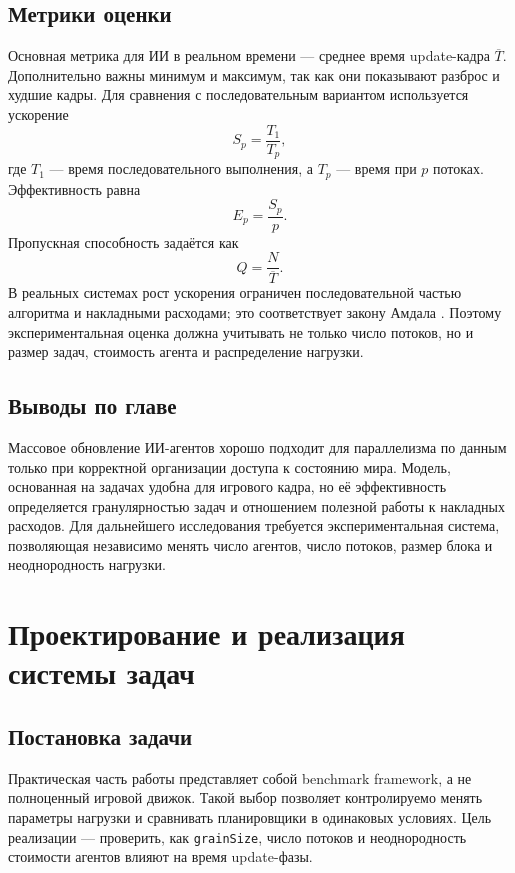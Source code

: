 \documentclass[14pt,a4paper,oneside]{extreport}
\begin{document}
\section{Метрики оценки}

Основная метрика для ИИ в реальном времени --- среднее время update-кадра \(\overline{T}\). Дополнительно важны минимум и максимум, так как они показывают разброс и худшие кадры. Для сравнения с последовательным вариантом используется ускорение
\begin{equation}
S_p = \frac{T_1}{T_p},
\end{equation}
где \(T_1\) --- время последовательного выполнения, а \(T_p\) --- время при \(p\) потоках. Эффективность равна
\begin{equation}
E_p = \frac{S_p}{p}.
\end{equation}
Пропускная способность задаётся как
\begin{equation}
Q = \frac{N}{\overline{T}}.
\end{equation}
В реальных системах рост ускорения ограничен последовательной частью алгоритма и накладными расходами; это соответствует закону Амдала \cite{amdahl_1967}. Поэтому экспериментальная оценка должна учитывать не только число потоков, но и размер задач, стоимость агента и распределение нагрузки.

\section{Выводы по главе}

Массовое обновление ИИ-агентов хорошо подходит для параллелизма по данным только при корректной организации доступа к состоянию мира. Модель, основанная на задачах удобна для игрового кадра, но её эффективность определяется гранулярностью задач и отношением полезной работы к накладных расходов. Для дальнейшего исследования требуется экспериментальная система, позволяющая независимо менять число агентов, число потоков, размер блока и неоднородность нагрузки.

\chapter{Проектирование и реализация системы задач}

\section{Постановка задачи}

Практическая часть работы представляет собой benchmark framework, а не полноценный игровой движок. Такой выбор позволяет контролируемо менять параметры нагрузки и сравнивать планировщики в одинаковых условиях. Цель реализации --- проверить, как \texttt{grainSize}, число потоков и неоднородность стоимости агентов влияют на время update-фазы.
\end{document}
